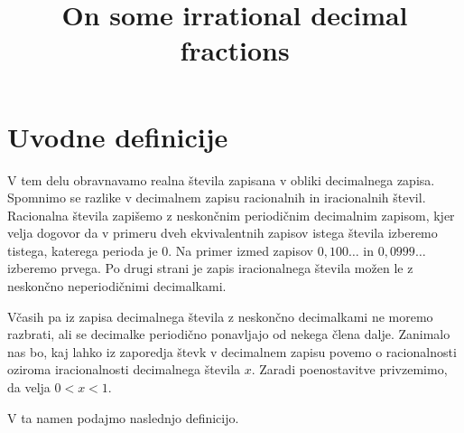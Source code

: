 \documentclass[twoside,11pt]{article}
\begin{document}




\klasifikacija{~} 


\title{On some irrational decimal fractions}



\glava\baselineskip=14.5pt

\smallskip


\section{Uvodne definicije}
V tem delu obravnavamo realna števila zapisana v obliki decimalnega zapisa.
Spomnimo se razlike v decimalnem zapisu racionalnih in iracionalnih števil.
Racionalna števila zapišemo z neskončnim periodičnim decimalnim zapisom, 
kjer velja dogovor da v primeru dveh ekvivalentnih zapisov istega števila izberemo tistega, katerega perioda je $0$.
Na primer izmed zapisov $0,100 \dots$ in $0,0999 \dots$ izberemo prvega. 
Po drugi strani je zapis iracionalnega števila možen 
le z neskončno neperiodičnimi decimalkami.

Včasih pa iz zapisa decimalnega števila z neskončno decimalkami ne moremo razbrati, ali 
se decimalke periodično ponavljajo od nekega člena dalje.
Zanimalo nas bo, kaj lahko iz zaporedja števk v decimalnem zapisu povemo o racionalnosti oziroma iracionalnosti
decimalnega števila $x$.
Zaradi poenostavitve privzemimo, da velja $ 0 < x < 1$.

V ta namen podajmo naslednjo definicijo.
\end{document}
